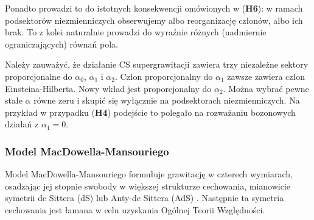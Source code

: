 \documentclass[12pt,a4paper]{article}
\begin{document}
Ponadto prowadzi to do istotnych konsekwencji omówionych w (\textbf{H6}): w ramach podsektorów niezmienniczych obserwujemy albo reorganizację członów, albo ich brak. To z kolei naturalnie prowadzi do wyraźnie różnych (nadmiernie ograniczających) równań pola.

Należy zauważyć, że działanie CS supergrawitacji zawiera trzy niezależne sektory proporcjonalne do $\alpha _{0}$, $\alpha _{1}$ i $\alpha _{2}$. Człon proporcjonalny do $\alpha _{1}$ zawsze zawiera człon Einsteina-Hilberta. Nowy wkład jest proporcjonalny do $\alpha _{2}$. Można wybrać pewne stałe $\alpha$ równe zeru i skupić się wyłącznie na podsektorach niezmienniczych. Na przykład w przypadku (\textbf{H4}) podejście to polegało na rozważaniu bozonowych działań z $\alpha_1 = 0$.

\subsubsection{Model MacDowella-Mansouriego}

Model MacDowella-Mansouriego formułuje grawitację w czterech wymiarach, osadzając jej stopnie swobody w większej strukturze cechowania, mianowicie symetrii de Sittera (dS) lub Anty-de Sittera (AdS) \cite{Durka:2012wd, MacDowell:1977jt}. Następnie ta symetria cechowania jest łamana w celu uzyskania Ogólnej Teorii Względności.
\end{document}
